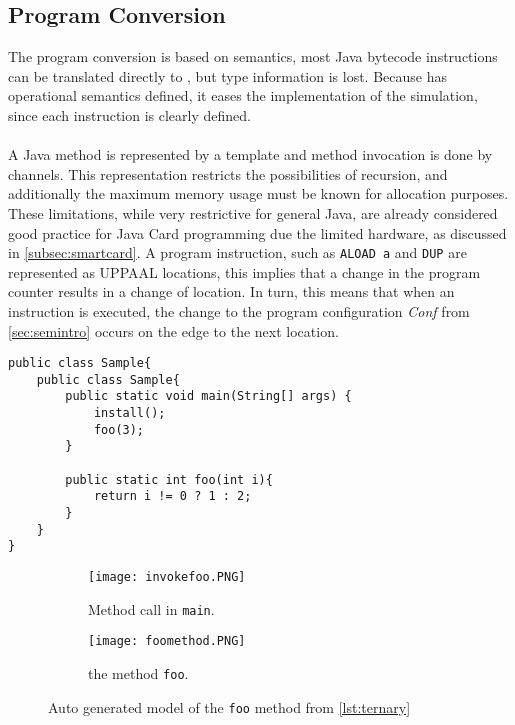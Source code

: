 \subsection{Program Conversion}\label{sec:programConversion}
The program conversion is based on \jcl semantics, most Java bytecode instructions can be translated directly to \jcl, but type information is lost. Because \jcl has operational semantics defined, it eases the implementation of the simulation, since each instruction is clearly defined.\\\\
A Java method is represented by a template and method invocation is done by channels. This representation restricts the possibilities of recursion, and additionally the maximum memory usage must be known for allocation purposes. 
These limitations, while very restrictive for general Java, are already considered good practice for Java Card programming due the limited hardware, as discussed in \cref{subsec:smartcard}.
A program instruction, such as \texttt{ALOAD a} and \texttt{DUP} are represented as UPPAAL locations, this implies that a change in the program counter results in a change of location. 
In turn, this means that when an instruction is executed, the change to the program configuration \textit{Conf} from \cref{sec:semintro} occurs on the edge to the next location.


\begin{lstlisting}[caption={Java code sample to be converted to a UPPAAL model.}, label={lst:ternary}]
public class Sample{
    public class Sample{
        public static void main(String[] args) {
            install();
            foo(3);
        }
        
        public static int foo(int i){
            return i != 0 ? 1 : 2;
        }
    }
}
\end{lstlisting}

\begin{figure}
\begin{subfigure}{\textwidth}
	\texttt{[image: invokefoo.PNG]}
	\caption{Method call in \texttt{main}.}
\end{subfigure}
\begin{subfigure}{\textwidth}
	\texttt{[image: foomethod.PNG]}
	\caption{the method \texttt{foo}.}
	\label{fig:uppaal3}
\end{subfigure}

\caption{Auto generated model of the \texttt{foo} method from \cref{lst:ternary}}
\label{fig:fooMethod}
\end{figure}



